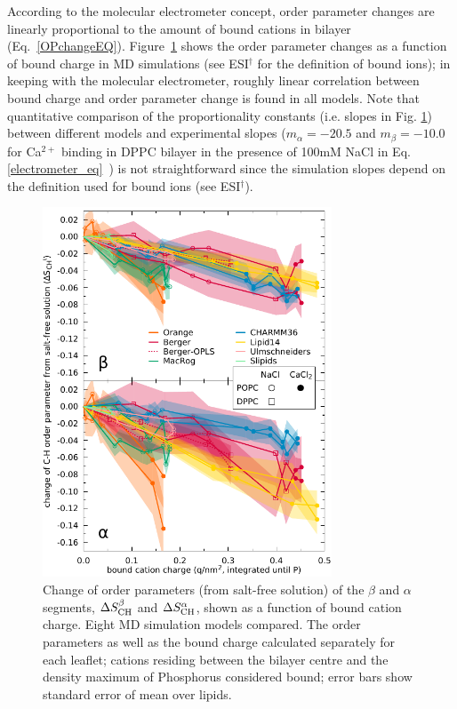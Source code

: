 \documentclass[twoside,twocolumn,9pt]{article}
\begin{document}
According to the molecular electrometer concept, order parameter changes are linearly proportional to
the amount of bound cations in bilayer (Eq.~\eqref{OPchangeEQ}).
Figure~\ref{electrometer} shows the order parameter changes as a function of bound charge in MD simulations
(see ESI$^\dag$ for the definition of bound ions);
in keeping with the molecular electrometer, roughly linear correlation between bound charge and order parameter change is found in all models.
Note that quantitative comparison of the proportionality constants (i.e. slopes in Fig. \ref{electrometer})
between different models and experimental slopes
($m_\alpha=-20.5$ and $m_\beta=-10.0$ for Ca$^{2+}$ binding in DPPC bilayer in
the presence of 100mM NaCl in Eq. \ref{electrometer_eq}~\cite{altenbach84}) is not straightforward 
since the simulation slopes depend on the definition used for bound ions (see ESI$^\dag$).
\begin{figure}[t]
  \centering
  \includegraphics[width=8.6cm]{../scratch/boundIons/dOP_vs_boundCationCharge_P.pdf}
  \caption{\label{electrometer}
    Change of order parameters (from salt-free solution) of the $\beta$ and $\alpha$ segments,
    $\Delta S_{\rm{CH}}^{\beta}$ and $\Delta S_{\rm{CH}}^{\alpha}$,
    shown as a function of bound cation charge.
    Eight MD simulation models compared.
    The order parameters as well as the bound charge calculated separately for
    each leaflet; cations residing between the bilayer centre and the density maximum of Phosphorus
    considered bound; error bars show standard error of mean over lipids.
   }
\end{figure}
\end{document}
